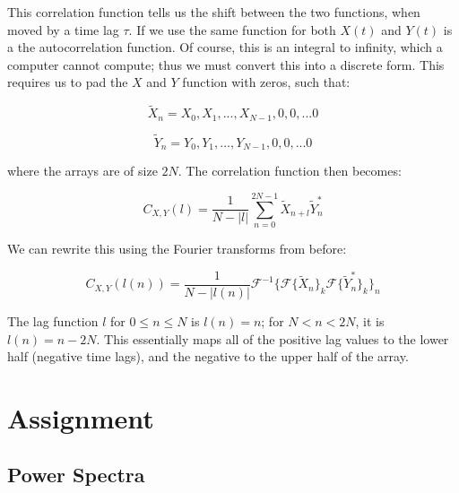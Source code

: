 \documentclass[12pt]{article}
\begin{document}
This correlation function tells us the shift between the two functions, when moved by a time lag $\tau$. If we use the same function for both $X(t)$ and $Y(t)$ is a the autocorrelation function. Of course, this is an integral to infinity, which a computer cannot compute; thus we must convert this into a discrete form. This requires us to pad the $X$ and $Y$ function with zeros, such that:

\begin{equation}
\widetilde{X}_n = X_0, X_1, ..., X_{N-1}, 0, 0, ... 0
\end{equation}

\begin{equation}
\widetilde{Y}_n = Y_0, Y_1, ..., Y_{N-1}, 0, 0, ... 0
\end{equation}

where the arrays are of size $2N$. The correlation function then becomes:

\begin{equation}
C_{X,Y} (l) = \frac{1}{N-|l|} \sum_{n=0}^{2N-1} \widetilde{X}_{n+l} \widetilde{Y}^*_n
\end{equation}

We can rewrite this using the Fourier transforms from before:

\begin{equation}
C_{X,Y} (l(n)) = \frac{1}{N-|l(n)|} \mathcal{F}^{-1} \lbrace \mathcal{F} \lbrace \widetilde{X}_n \rbrace_k \mathcal{F} \lbrace \widetilde{Y}^*_n \rbrace_k \rbrace_n
\end{equation}

The lag function $l$ for $0 \leq n \leq N$ is $l(n) = n$; for $N < n < 2N$, it is $l(n) = n-2N$. This essentially maps all of the positive lag values to the lower half (negative time lags), and the negative to the upper half of the array. 






\section*{Assignment}

\subsection*{Power Spectra}

\end{document}
